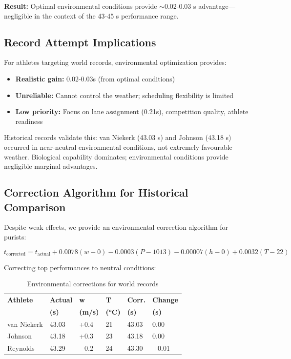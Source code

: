 \textbf{Result:} Optimal environmental conditions provide $\sim$0.02-0.03 s advantage—negligible in the context of the 43-45 s performance range.

\subsection{Record Attempt Implications}

For athletes targeting world records, environmental optimization provides:
\begin{itemize}
    \item \textbf{Realistic gain:} 0.02-0.03s (from optimal conditions)
    \item \textbf{Unreliable:} Cannot control the weather; scheduling flexibility is limited
    \item \textbf{Low priority:} Focus on lane assignment (0.21s), competition quality, athlete readiness
\end{itemize}

Historical records validate this: van Niekerk (43.03 s) and Johnson (43.18 s) occurred in near-neutral environmental conditions, not extremely favourable weather. Biological capability dominates; environmental conditions provide negligible marginal advantages.

\subsection{Correction Algorithm for Historical Comparison}

Despite weak effects, we provide an environmental correction algorithm for purists:

\begin{equation}
t_{\text{corrected}} = t_{\text{actual}} + 0.0078(w - 0) - 0.0003(P - 1013) - 0.00007(h - 0) + 0.0032(T - 22)
\end{equation}

Correcting top performances to neutral conditions:

\begin{table}[H]
\centering
\caption{Environmental corrections for world records}
\begin{tabular}{@{}llllll@{}}
\toprule
\textbf{Athlete} & \textbf{Actual} & \textbf{w} & \textbf{T} & \textbf{Corr.} & \textbf{Change} \\
 & \textbf{(s)} & \textbf{(m/s)} & \textbf{(°C)} & \textbf{(s)} & \textbf{(s)} \\
\midrule
van Niekerk & 43.03 & +0.4 & 21 & 43.03 & 0.00 \\
Johnson & 43.18 & +0.3 & 23 & 43.18 & 0.00 \\
Reynolds & 43.29 & $-0.2$ & 24 & 43.30 & +0.01 \\
\bottomrule
\end{tabular}
\end{table}

